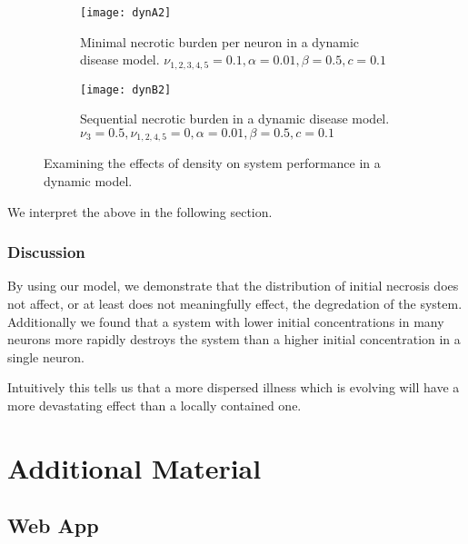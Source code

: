 \documentclass[11pt]{report}
\begin{document}
\begin{figure}
    \centering
    \begin{subfigure}[b]{0.48\textwidth}
        \texttt{[image: dynA2]}
        \caption{Minimal necrotic burden per neuron in a dynamic disease model. $\nu_{1,2,3,4,5} = 0.1, \alpha = 0.01, \beta = 0.5,c = 0.1$}
        \label{fig:dynA2}
    \end{subfigure}
    \hfill %
    \begin{subfigure}[b]{0.48\textwidth}
        \texttt{[image: dynB2]}
        \caption{Sequential necrotic burden in a dynamic disease model. $\nu_{3} = 0.5, \nu_{1,2,4,5} = 0, \alpha = 0.01, \beta = 0.5,c = 0.1$}
        \label{fig:dynB2}
    \end{subfigure}
    \caption{Examining the effects of density on system performance in a dynamic model. }\label{fig:dispersion}
\end{figure}


We interpret the above in the following section.


\subsection{Discussion} %
\label{sub:discussion}


By using our model, we demonstrate that the distribution of initial necrosis does not affect, or at least does not meaningfully effect, the degredation of the system. Additionally we found that a system with lower initial concentrations in many neurons more rapidly destroys the system than a higher initial concentration in a single neuron. 

Intuitively this tells us that a more dispersed illness which is evolving will have a more devastating effect than a locally contained one. 

\chapter{Additional Material} %
\label{sub:web_app}


\section{Web App} %
\label{sec:web_app}
\end{document}
